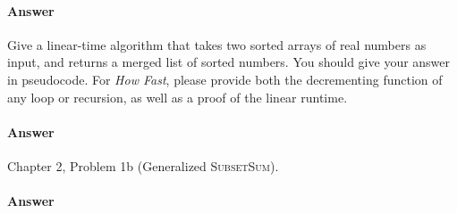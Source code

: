 \documentclass{article}
\begin{document}
\paragraph{Answer}


\collab{\todo{}}

Give a linear-time algorithm that takes two sorted arrays of real numbers as
input, and returns a merged list of sorted numbers.  You should give your answer
in pseudocode.  For \emph{How Fast}, please provide both the decrementing
function of any loop or recursion, as well as a proof of the linear runtime.

\paragraph{Answer}


\collab{\todo{}}

Chapter 2, Problem 1b (Generalized \textsc{SubsetSum}).

\paragraph{Answer}

\end{document}
